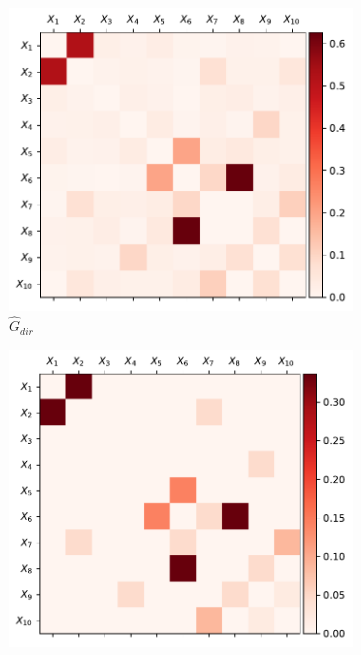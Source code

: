 \documentclass[../Thesis.tex]{subfiles}
\begin{document}
\newpage
\begin{figure}[H]
    \centering
    \begin{subfigure}[t]{0.49\linewidth}
        \includegraphics[width = \linewidth]{figures/ND examples/Gaussian network 10 - G_dir - symmetric.pdf}
        \caption{$\hat{G}_{dir}$}
    \end{subfigure}
    \hfill
    \begin{subfigure}[t]{0.49\linewidth}
        \includegraphics[width = \linewidth]{figures/ND examples/Gaussian network 10 - G_dir true - symmetric.pdf}

\end{subfigure}
\end{figure}
\end{document}
